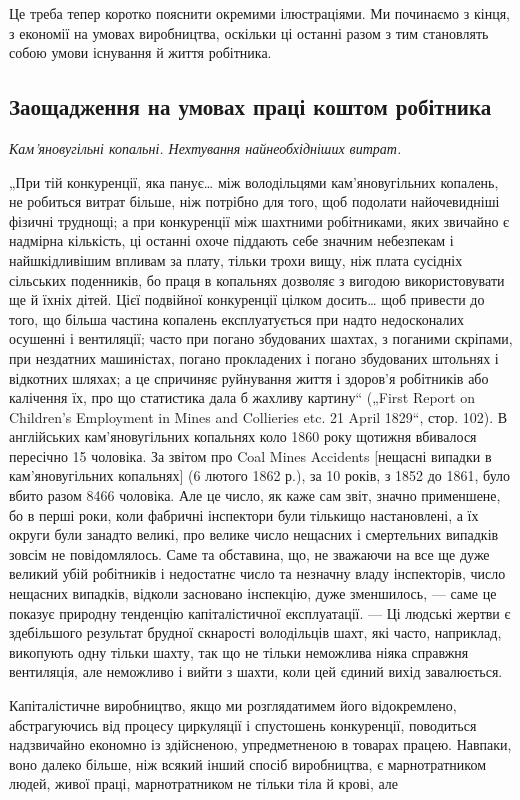 
Це треба тепер коротко пояснити окремими ілюстраціями.
Ми починаємо з кінця, з економії на умовах виробництва,
оскільки ці останні разом з тим становлять собою умови існування й життя робітника.

\subsection{Заощадження на умовах праці коштом робітника}

\emph{Кам’яновугільні копальні. Нехтування найнеобхідніших витрат.}

„При тій конкуренції, яка панує\dots{} між володільцями кам’яновугільних копалень, не робиться витрат
більше, ніж потрібно
для того, щоб подолати найочевидніші фізичні труднощі; а при
конкуренції між шахтними робітниками, яких звичайно є надмірна кількість, ці останні охоче піддають
себе значним небезпекам і найшкідливішим впливам за плату, тільки трохи вищу,
ніж плата сусідніх сільських поденників, бо праця в копальнях
дозволяє з вигодою використовувати ще й їхніх дітей. Цієї подвійної конкуренції цілком досить\dots{} щоб
привести до того, що
більша частина копалень експлуатується при надто недосконалих осушенні і вентиляції; часто при
погано збудованих шахтах,
з поганими скріпами, при нездатних машиністах, погано прокладених і погано збудованих штольнях і
відкотних шляхах; а це спричиняє руйнування життя і здоров’я робітників або калічення їх,
про що статистика дала б жахливу картину“ („First Report
on Children’s Employment in Mines and Collieries etc. 21 April
1829“, стор. 102). В англійських кам’яновугільних копальнях коло
1860 року щотижня вбивалося пересічно 15 чоловіка. За звітом
про Coal Mines Accidents [нещасні випадки в кам’яновугільних
копальнях] (6 лютого 1862 р.), за 10 років, з 1852 до 1861,
було вбито разом 8466 чоловіка. Але це число, як каже сам
звіт, значно применшене, бо в перші роки, коли фабричні інспектори були тількищо настановлені, а їх
округи були занадто
великі, про велике число нещасних і смертельних випадків зовсім не повідомлялось. Саме та обставина,
що, не зважаючи на
все ще дуже великий убій робітників і недостатнє число та
незначну владу інспекторів, число нещасних випадків, відколи
засновано інспекцію, дуже зменшилось, — саме це показує природну тенденцію капіталістичної
експлуатації. — Ці людські
жертви є здебільшого результат брудної скнарості володільців
шахт, які часто, наприклад, викопують одну тільки шахту, так
що не тільки неможлива ніяка справжня вентиляція, але неможливо і вийти з шахти, коли цей єдиний
вихід завалюється.

Капіталістичне виробництво, якщо ми розглядатимем його
відокремлено, абстрагуючись від процесу циркуляції і спустошень конкуренції, поводиться надзвичайно
економно із здійсненою, упредметненою в товарах працею. Навпаки, воно далеко
більше, ніж всякий інший спосіб виробництва, є марнотратником
людей, живої праці, марнотратником не тільки тіла й крові, але
\parbreak{}  %
